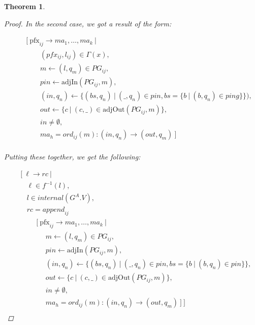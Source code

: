 \documentclass[twocolumn, openany]{sig-alternate-10pt}
\newcommand{\Pfx}{\mathrm{pfx}}%
\newtheorem{thm}{Theorem}
\begin{document}
\begin{thm}
\begin{proof}
  In the second case, we got a result of the form:

 \[ \begin{array}{l}
     ~~~~~~~~~ [~ \Pfx_{ij} \rightarrow ma_1, \dots, ma_k ~\vert~ \\
     ~~~~~~~~~~~~~~~~~~ (pfx_{ij}, l_{ij}) \in \Gamma(x), \\
     ~~~~~~~~~~~~~~~~~~ m \leftarrow (l,q_m) \in PG_{ij}, \\
     ~~~~~~~~~~~~~~~~~~ pin \leftarrow \text{adjIn}(PG_{ij},m), \\
     ~~~~~~~~~~~~~~~~~~ (in,q_n) \leftarrow \{ (bs,q_n) ~\vert~ (\_,q_n) \in pin, bs=\{ b ~\vert~ (b,q_n) \in ping \} \}), \\
     ~~~~~~~~~~~~~~~~~~ out \leftarrow \{ c ~\vert~ (c,\_) \in \text{adjOut}(PG_{ij},m) \}, \\
     ~~~~~~~~~~~~~~~~~~ in \neq \emptyset, \\
     ~~~~~~~~~~~~~~~~~~ ma_h = ord_{ij}(m) : (in,q_n) \rightarrow (out,q_m) ~] \\
  \end{array} \]%

  Putting these together, we get the following:

  \[ \begin{array}{l}
     ~~~~~ [~ \ell \rightarrow rc ~\vert~ \\
     ~~~~~~~~~ \ell \in f^{-1}(l), \\
     ~~~~~~~~~ l \in internal(G^A.V), \\
     ~~~~~~~~~ rc = \mathit{append}_{ij}~  \\
     ~~~~~~~~~~~~~~~ [~ \Pfx_{ij} \rightarrow ma_1, \dots, ma_k ~\vert~ \\
     ~~~~~~~~~~~~~~~~~~~~~ m \leftarrow (l,q_m) \in PG_{ij}, \\
     ~~~~~~~~~~~~~~~~~~~~~ pin \leftarrow \text{adjIn}(PG_{ij},m), \\
     ~~~~~~~~~~~~~~~~~~~~~ (in,q_n) \leftarrow \{ (bs,q_n) ~\vert~ (\_,q_n) \in pin, bs=\{b ~\vert~ (b,q_n) \in pin \} \}, \\
     ~~~~~~~~~~~~~~~~~~~~~ out \leftarrow \{ c ~\vert~ (c,\_) \in \text{adjOut}(PG_{ij},m) \}, \\
     ~~~~~~~~~~~~~~~~~~~~~ in \neq \emptyset, \\
     ~~~~~~~~~~~~~~~~~~~~~ ma_h = ord_{ij}(m) : (in,q_n) \rightarrow (out,q_m) ~] ~] \\
  \end{array} \]%



\end{proof}
\end{thm}
\end{document}
